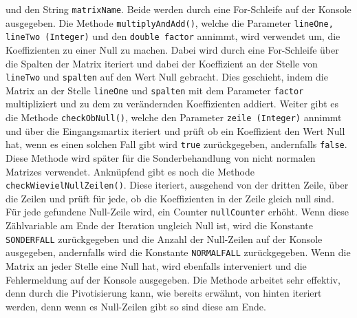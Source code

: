 \documentclass[a4paper, 12pt]{report}
\begin{document}
\begin{sloppypar}
und den String \texttt{matrixName}. Beide werden durch eine For-Schleife auf der Konsole ausgegeben.
Die Methode \texttt{multiplyAndAdd()}, welche die Parameter \texttt{lineOne, lineTwo (Integer)}
und den \texttt{double factor} annimmt, wird verwendet um, die Koeffizienten zu einer Null zu machen.
Dabei wird durch eine For-Schleife über die Spalten der Matrix iteriert
und dabei der Koeffizient an der Stelle von \texttt{lineTwo} und \texttt{spalten} auf den Wert Null gebracht.
Dies geschieht, indem die Matrix an der Stelle \texttt{lineOne} und \texttt{spalten} mit dem Parameter \texttt{factor} multipliziert
und zu dem zu verändernden Koeffizienten addiert.
Weiter gibt es die Methode \texttt{checkObNull()}, welche den Parameter \texttt{zeile (Integer)} annimmt
und über die Eingangsmartix iteriert und prüft ob ein Koeffizient den Wert Null hat, wenn es einen solchen Fall gibt
wird \texttt{true} zurückgegeben, andernfalls \texttt{false}.
Diese Methode wird später für die Sonderbehandlung von nicht normalen Matrizes verwendet.
Anknüpfend gibt es noch die Methode \texttt{checkWievielNullZeilen()}. Diese iteriert, ausgehend von der dritten Zeile,
über die Zeilen und prüft für jede, ob die Koeffizienten in der Zeile gleich null sind. Für jede gefundene Null-Zeile wird, ein Counter
\texttt{nullCounter} erhöht. Wenn diese Zählvariable am Ende der Iteration ungleich Null ist, wird die Konstante \texttt{SONDERFALL} zurückgegeben
und die Anzahl der Null-Zeilen auf der Konsole ausgegeben, andernfalls wird die Konstante \texttt{NORMALFALL} zurückgegeben.
Wenn die Matrix an jeder Stelle eine Null hat, wird ebenfalls interveniert und die Fehlermeldung auf der Konsole ausgegeben.
Die Methode arbeitet sehr effektiv, denn durch die Pivotisierung kann, wie bereits erwähnt, von hinten iteriert werden, denn
wenn es Null-Zeilen gibt so sind diese am Ende.


\end{sloppypar}
\end{document}
